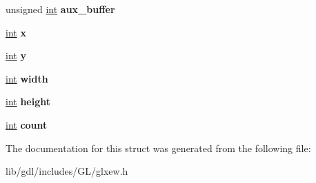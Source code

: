 \begin{DoxyCompactItemize}
\item 
\hypertarget{struct_g_l_x_pbuffer_clobber_event_a13193b6e7e3e52b15f754fe91403b7ec}{}unsigned \hyperlink{_s_d_l__thread_8h_a6a64f9be4433e4de6e2f2f548cf3c08e}{int} {\bfseries aux\+\_\+buffer}\label{struct_g_l_x_pbuffer_clobber_event_a13193b6e7e3e52b15f754fe91403b7ec}

\item 
\hypertarget{struct_g_l_x_pbuffer_clobber_event_a8f0a7162a033c89ee94ce535580dbc32}{}\hyperlink{_s_d_l__thread_8h_a6a64f9be4433e4de6e2f2f548cf3c08e}{int} {\bfseries x}\label{struct_g_l_x_pbuffer_clobber_event_a8f0a7162a033c89ee94ce535580dbc32}

\item 
\hypertarget{struct_g_l_x_pbuffer_clobber_event_a69eb7ac60d36ac3ec4550ac206cfc61f}{}\hyperlink{_s_d_l__thread_8h_a6a64f9be4433e4de6e2f2f548cf3c08e}{int} {\bfseries y}\label{struct_g_l_x_pbuffer_clobber_event_a69eb7ac60d36ac3ec4550ac206cfc61f}

\item 
\hypertarget{struct_g_l_x_pbuffer_clobber_event_aaca375fecb872c73c60cd5d0bfc7c7a5}{}\hyperlink{_s_d_l__thread_8h_a6a64f9be4433e4de6e2f2f548cf3c08e}{int} {\bfseries width}\label{struct_g_l_x_pbuffer_clobber_event_aaca375fecb872c73c60cd5d0bfc7c7a5}

\item 
\hypertarget{struct_g_l_x_pbuffer_clobber_event_aed4e539c896bdad15217bf92c28f8520}{}\hyperlink{_s_d_l__thread_8h_a6a64f9be4433e4de6e2f2f548cf3c08e}{int} {\bfseries height}\label{struct_g_l_x_pbuffer_clobber_event_aed4e539c896bdad15217bf92c28f8520}

\item 
\hypertarget{struct_g_l_x_pbuffer_clobber_event_a61e9f6b31738464dca67f909fcacd298}{}\hyperlink{_s_d_l__thread_8h_a6a64f9be4433e4de6e2f2f548cf3c08e}{int} {\bfseries count}\label{struct_g_l_x_pbuffer_clobber_event_a61e9f6b31738464dca67f909fcacd298}

\end{DoxyCompactItemize}


The documentation for this struct was generated from the following file\+:\begin{DoxyCompactItemize}
\item 
lib/gdl/includes/\+G\+L/glxew.\+h\end{DoxyCompactItemize}
